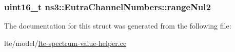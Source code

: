 \subsubsection[{\texorpdfstring{range\+Nul2}{rangeNul2}}]{\setlength{\rightskip}{0pt plus 5cm}uint16\+\_\+t ns3\+::\+Eutra\+Channel\+Numbers\+::range\+Nul2}\hypertarget{structns3_1_1EutraChannelNumbers_ad03939a99cbce8ad704dc575e8e2db3c}{}\label{structns3_1_1EutraChannelNumbers_ad03939a99cbce8ad704dc575e8e2db3c}


The documentation for this struct was generated from the following file\+:\begin{DoxyCompactItemize}
\item 
lte/model/\hyperlink{lte-spectrum-value-helper_8cc}{lte-\/spectrum-\/value-\/helper.\+cc}\end{DoxyCompactItemize}
